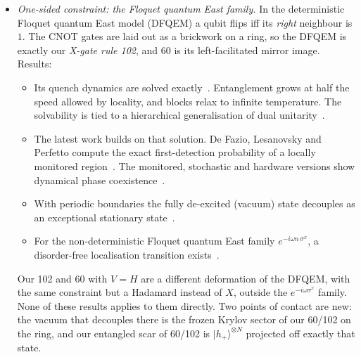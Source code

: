 \begin{itemize}
  A different quantum deformation of RCA54 is integrable~\cite{paletta2026}: $X$ is kept on the active patterns and only
  the $00$ pattern carries a general $U(2)$ gate. It does not contain our 54, which acts with $H$ on the active patterns
  and with the identity on $00$.
\item \emph{One-sided constraint: the Floquet quantum East family.} In the deterministic Floquet quantum East model
  (DFQEM) a qubit flips iff its \emph{right} neighbour is $1$. The CNOT gates are laid out as a brickwork on a ring, so
  the DFQEM is exactly our \emph{X-gate rule 102}, and 60 is its left-facilitated mirror image. Results:
  \begin{itemize}
  \item Its quench dynamics are solved exactly~\cite{bertini2024det}. Entanglement grows at half the speed allowed by
    locality, and blocks relax to infinite temperature. The solvability is tied to a hierarchical generalisation of dual
    unitarity~\cite{yu2024}.
  \item The latest work builds on that solution. De Fazio, Lesanovsky and Perfetto compute the exact first-detection
    probability of a locally monitored region~\cite{defazio2026}. The monitored, stochastic and hardware versions show
    dynamical phase coexistence~\cite{klobas2024,defazio2024,cech2026a,cech2026b}.
  \item With periodic boundaries the fully de-excited (vacuum) state decouples as an exceptional stationary
    state~\cite{cech2026a}.
  \item For the non-deterministic Floquet quantum East family $e^{-i\omega n\,\sigma^x}$, a disorder-free localisation
    transition exists~\cite{bertini2024east}.
  \end{itemize}
  Our 102 and 60 with $V=H$ are a different deformation of the DFQEM, with the same constraint but a Hadamard instead of
  $X$, outside the $e^{-i\omega\sigma^x}$ family. None of these results applies to them directly. Two points of contact
  are new: the vacuum that decouples there is the frozen Krylov sector of our 60/102 on the ring, and our entangled scar
  of 60/102 is $|h_+\rangle^{\otimes N}$ projected off exactly that state.
\end{itemize}

